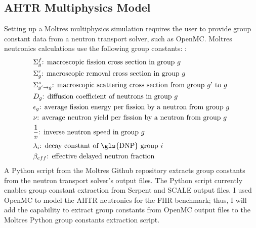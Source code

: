 \subsection{AHTR Multiphysics Model}
\label{sec:ahtr_multiphysics_model}
Setting up a Moltres multiphysics simulation requires the user to provide group 
constant data from a neutron transport solver, such as OpenMC. 
Moltres neutronics calculations use the following group constants:
\cite{lindsay_introduction_2018,park_advancement_2020}: 
\begin{align*}
  &\Sigma^f_{g} \text{: macroscopic fission cross section in group $g$} \\
  &\Sigma^r_{g} \text{: macroscopic removal cross section in group $g$} \\
  &\Sigma^s_{g' \rightarrow g} \text{: macroscopic scattering cross section
  from group $g$' to $g$} \\
  &D_g \text{: diffusion coefficient of neutrons in group $g$} \\
  &\epsilon_g \text{: average fission energy per fission by a neutron from
  group $g$} \\
  &\nu \text{: average neutron yield per fission by a neutron from group
  $g$} \\
  &\frac{1}{v} \text{: inverse neutron speed in group $g$} \\
  &\lambda_i \text{: decay constant of \gls{DNP} group $i$} \\
  &\beta_{eff} \text{: effective delayed neutron fraction} 
\end{align*}
A Python script from the Moltres Github repository \cite{lindsay_moltres_2017}
extracts group constants from the neutron transport solver's output files.
The Python script currently enables group constant extraction from Serpent 
\cite{leppanen_serpent_2014} and SCALE \cite{bucholz_scale:_1982} output files.
I used OpenMC to model the \gls{AHTR} neutronics for the \gls{FHR} benchmark;
thus, I will add the capability to extract group constants from OpenMC output 
files to the Moltres Python group constants extraction script. 

